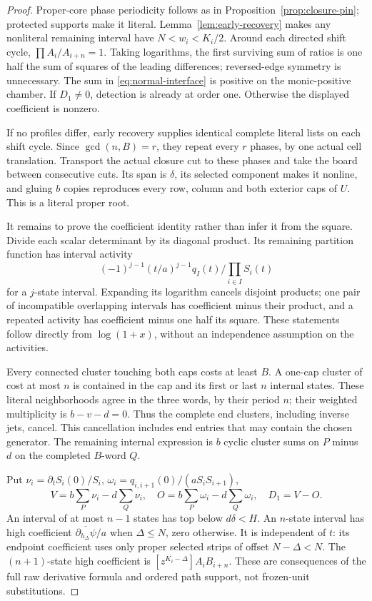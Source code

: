 \documentclass[11pt,a4paper]{amsart}
\numberwithin{equation}{section}
\theoremstyle{plain}
\theoremstyle{definition}
\begin{document}
\begin{proof}
Proper-core phase periodicity follows as in Proposition~\ref{prop:closure-pin}; protected supports make it literal.  Lemma~\ref{lem:early-recovery} makes any nonliteral remaining interval have \(N<w_i<K_i/2\).  Around each directed shift cycle, \(\prod A_i/A_{i+n}=1\).  Taking logarithms, the first surviving sum of ratios is one half the sum of squares of the leading differences; reversed-edge symmetry is unnecessary.  The sum in \eqref{eq:normal-interface} is positive on the monic-positive chamber.  If \(D_1\ne0\), detection is already at order one.  Otherwise the displayed coefficient is nonzero.

If no profiles differ, early recovery supplies identical complete literal lists on each shift cycle.  Since \(\gcd(n,B)=r\), they repeat every \(r\) phases, by one actual cell translation.  Transport the actual closure cut to these phases and take the board between consecutive cuts.  Its span is \(\delta\), its selected component makes it nonline, and gluing \(b\) copies reproduces every row, column and both exterior caps of \(U\).  This is a literal proper root.

It remains to prove the coefficient identity rather than infer it from the square.  Divide each scalar determinant by its diagonal product.  Its remaining partition function has interval activity
\[
 (-1)^{j-1}(t/a)^{j-1}q_I(t)/\prod_{i\in I}S_i(t)
\]
for a \(j\)-state interval.  Expanding its logarithm cancels disjoint products; one pair of incompatible overlapping intervals has coefficient minus their product, and a repeated activity has coefficient minus one half its square.  These statements follow directly from \(\log(1+x)\), without an independence assumption on the activities.

Every connected cluster touching both caps costs at least \(B\).  A one-cap cluster of cost at most \(n\) is contained in the cap and its first or last \(n\) internal states.  These literal neighborhoods agree in the three words, by their period \(n\); their weighted multiplicity is \(b-v-d=0\).  Thus the complete end clusters, including inverse jets, cancel.  This cancellation includes end entries that may contain the chosen generator.  The remaining internal expression is \(b\) cyclic cluster sums on \(P\) minus \(d\) on the completed \(B\)-word \(Q\).

Put \(\nu_i=\partial_tS_i(0)/S_i\), \(\omega_i=q_{i,i+1}(0)/(aS_iS_{i+1})\),
\[
 V=b\sum_P\nu_i-d\sum_Q\nu_i,\quad
 O=b\sum_P\omega_i-d\sum_Q\omega_i,\quad D_1=V-O.
\]
An interval of at most \(n-1\) states has top below \(d\delta<H\).  An \(n\)-state interval has high coefficient \(\overline{\partial_{h_\Delta}\psi}/a\) when \(\Delta\le N\), zero otherwise.  It is independent of \(t\): its endpoint coefficient uses only proper selected strips of offset \(N-\Delta<N\).  The \((n+1)\)-state high coefficient is \([z^{K_i-\Delta}]A_iB_{i+n}\).  These are consequences of the full raw derivative formula and ordered path support, not frozen-unit substitutions.


\end{proof}
\end{document}
